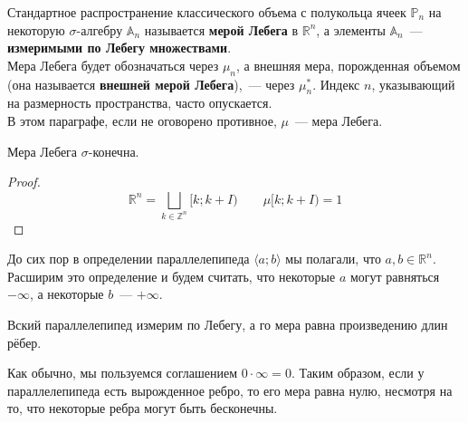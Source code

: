 \documentclass{article}
\begin{document}
    \begin{definition}
        Стандартное распространение классического объема с полукольца ячеек $\mathbb P_n$ на некоторую $\sigma$-алгебру $\mathbb A_n$ называется \textbf{мерой Лебега} в $\mathbb R^n$, а элементы $\mathbb A_n$~--- \textbf{измеримыми по Лебегу множествами}.\\
        Мера Лебега будет обозначаться через $\mu_n$, а внешняя мера, порожденная объемом (она называется \textbf{внешней мерой Лебега}),~--- через $\mu_n^*$. Индекс $n$, указывающий на размерность пространства, часто опускается.\\
        В этом параграфе, если не оговорено противное, $\mu$~--- мера Лебега.
    \end{definition}
    \begin{claim}
        Мера Лебега $\sigma$-конечна.
    \end{claim}
    \begin{proof}
        $$
        \mathbb R^n=\bigsqcup\limits_{k\in\mathbb Z^n}[k;k+I)\qquad\mu[k;k+I)=1
        $$
    \end{proof}
    \begin{remark}
        До сих пор в определении параллелепипеда $\langle a;b\rangle$ мы полагали, что $a,b\in\mathbb R^n$. Расширим это определение и будем считать, что некоторые $a$ могут равняться $-\infty$, а некоторые $b$~--- $+\infty$.
    \end{remark}
    \begin{theorem}
        Вский параллелепипед измерим по Лебегу, а го мера равна произведению длин рёбер.
    \end{theorem}
    \begin{remark}
        Как обычно, мы пользуемся соглашением $0\cdot\infty=0$. Таким образом, если у параллелепипеда есть вырожденное ребро, то его мера равна нулю, несмотря на то, что некоторые ребра могут быть бесконечны.
    \end{remark}
\end{document}
